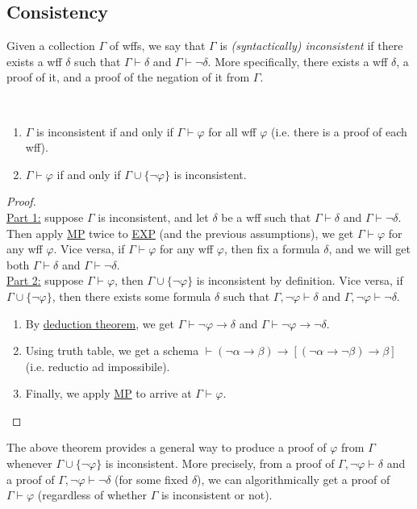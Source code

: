 \documentclass{treatise}
\begin{document}
\subsection{Consistency}
Given a collection $\Gamma$ of wffs, we say that $\Gamma$ is \emph{(syntactically) inconsistent} if there exists a wff $\delta$ such that $\Gamma \vdash \delta$ and $\Gamma \vdash \neg\delta$. More specifically, there exists a wff $\delta$, a proof of it, and a proof of the negation of it from $\Gamma$.
\begin{theorem} \ 
\begin{enumerate}
    \item $\Gamma$ is inconsistent if and only if $\Gamma \vdash \varphi$ for all wff $\varphi$ (i.e. there is a proof of each wff).
    \item $\Gamma \vdash \varphi$ if and only if $\Gamma \cup \{ \neg \varphi \}$ is inconsistent.
\end{enumerate}
\end{theorem}
\begin{proof} \ \\
\underline{Part 1:} suppose $\Gamma$ is inconsistent, and let $\delta$ be a wff such that $\Gamma \vdash \delta$ and $\Gamma \vdash \neg \delta$. Then apply \hyperref[HPL-R-MP]{MP} twice to \hyperref[HPL-T-EXP]{EXP} (and the previous assumptions), we get $\Gamma \vdash \varphi$ for any wff $\varphi$. Vice versa, if $\Gamma \vdash \varphi$ for any wff $\varphi$, then fix a formula $\delta$, and we will get both $\Gamma \vdash \delta$ and $\Gamma \vdash \neg\delta$.
\\
\underline{Part 2:} suppose $\Gamma \vdash \varphi$, then $\Gamma \cup \{ \neg \varphi \}$ is inconsistent by definition. Vice versa, if $\Gamma \cup \{ \neg \varphi \}$, then there exists some formula $\delta$ such that $\Gamma, \neg \varphi \vdash \delta$ and $\Gamma, \neg \varphi \vdash \neg \delta$.
\begin{enumerate}
    \item By \hyperref[logic-deduct-metathm]{deduction theorem}, we get $\Gamma \vdash \neg \varphi \to \delta$ and $\Gamma \vdash \neg \varphi \to \neg \delta$.
    \item Using truth table, we get a schema $\vdash (\neg \alpha \to \beta) \to [(\neg \alpha \to \neg \beta) \to \beta]$ (i.e. reductio ad impossibile).
    \item Finally, we apply \hyperref[HPL-R-MP]{MP} to arrive at $\Gamma \vdash \varphi$.
\end{enumerate}
\end{proof}
\begin{remark}
The above theorem provides a general way to produce a proof of $\varphi$ from $\Gamma$ whenever $\Gamma \cup \{ \neg \varphi \}$ is inconsistent. More precisely, from a proof of $\Gamma, \neg \varphi \vdash \delta$ and a proof of $\Gamma, \neg \varphi \vdash \neg \delta$ (for some fixed $\delta$), we can algorithmically get a proof of $\Gamma \vdash \varphi$ (regardless of whether $\Gamma$ is inconsistent or not).
\end{remark}
\end{document}
